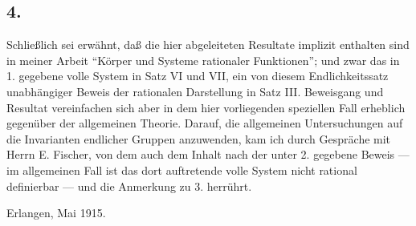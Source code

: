\subsection*{4.}
Schließlich sei erwähnt, daß die hier abgeleiteten Resultate implizit enthalten sind in meiner Arbeit ``Körper und Systeme rationaler Funktionen''; und zwar das in 1. gegebene volle System in Satz VI und VII, ein von diesem Endlichkeitssatz unabhängiger Beweis der rationalen Darstellung in Satz III. Beweisgang und Resultat vereinfachen sich aber in dem hier vorliegenden speziellen Fall erheblich gegenüber der allgemeinen Theorie. Darauf, die allgemeinen Untersuchungen auf die Invarianten endlicher Gruppen anzuwenden, kam ich durch Gespräche mit Herrn E. Fischer, von dem auch dem Inhalt nach der unter 2. gegebene Beweis --- im allgemeinen Fall ist das dort auftretende volle System nicht rational definierbar --- und die Anmerkung zu 3. herrührt.

Erlangen, Mai 1915.
